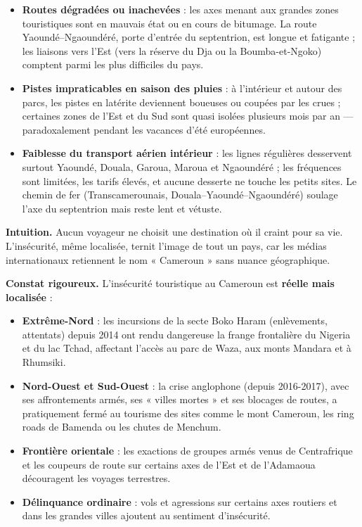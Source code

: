 \documentclass[11pt]{article}
\newcommand{\cle}[1]{{\popxbold\color{popdark}#1}}
\newcounter{popsec}
\newcounter{popsub}
\newcommand{\courssub}[1]{%
  \stepcounter{popsub}%
  \par\vspace{9pt}\noindent{\popxbold\fontsize{11.5}{13}\selectfont\color{popink}{\color{poporange}\thepopsec.\thepopsub}\hspace{6pt}#1}\par\nopagebreak\vspace{4pt}
}
\begin{document}
\begin{itemize}
\item \textbf{Routes dégradées ou inachevées} : les axes menant aux grandes zones touristiques sont en mauvais état ou en cours de bitumage. La route Yaoundé--Ngaoundéré, porte d'entrée du septentrion, est longue et fatigante ; les liaisons vers l'Est (vers la réserve du Dja ou la Boumba-et-Ngoko) comptent parmi les plus difficiles du pays.
\item \textbf{Pistes impraticables en saison des pluies} : à l'intérieur et autour des parcs, les pistes en latérite deviennent boueuses ou coupées par les crues ; certaines zones de l'Est et du Sud sont quasi isolées plusieurs mois par an — paradoxalement pendant les vacances d'été européennes.
\item \textbf{Faiblesse du transport aérien intérieur} : les lignes régulières desservent surtout Yaoundé, Douala, Garoua, Maroua et Ngaoundéré ; les fréquences sont limitées, les tarifs élevés, et aucune desserte ne touche les petits sites. Le chemin de fer (Transcamerounais, Douala--Yaoundé--Ngaoundéré) soulage l'axe du septentrion mais reste lent et vétuste.
\end{itemize}

\courssub{L'insécurité}

\textbf{Intuition.} Aucun voyageur ne choisit une destination où il craint pour sa vie. L'insécurité, même localisée, ternit l'image de tout un pays, car les médias internationaux retiennent le nom « Cameroun » sans nuance géographique.

\textbf{Constat rigoureux.} L'insécurité touristique au Cameroun est \textbf{réelle mais localisée} :

\begin{itemize}
\item \textbf{Extrême-Nord} : les incursions de la secte \cle{Boko Haram} (enlèvements, attentats) depuis 2014 ont rendu dangereuse la frange frontalière du Nigeria et du lac Tchad, affectant l'accès au parc de Waza, aux monts Mandara et à Rhumsiki.
\item \textbf{Nord-Ouest et Sud-Ouest} : la crise anglophone (depuis 2016-2017), avec ses affrontements armés, ses « villes mortes » et ses blocages de routes, a pratiquement fermé au tourisme des sites comme le mont Cameroun, les ring roads de Bamenda ou les chutes de Menchum.
\item \textbf{Frontière orientale} : les exactions de groupes armés venus de Centrafrique et les coupeurs de route sur certains axes de l'Est et de l'Adamaoua découragent les voyages terrestres.
\item \textbf{Délinquance ordinaire} : vols et agressions sur certains axes routiers et dans les grandes villes ajoutent au sentiment d'insécurité.
\end{itemize}
\end{document}
